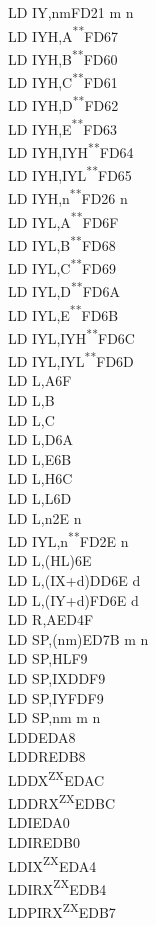 \documentclass[12pt,twoside,openright,a4paper]{book}
\newcommand{\UNDOC}{\textnormal{\textsuperscript{**}}}
\newcommand{\ZXN}{\textnormal{\textsuperscript{ZX}}}
\begin{document}
\begin{multicols}{3}
{\begin{tabbing}
		LD IY,nm\>FD21 m n\\
		LD IYH,A\UNDOC\>FD67\\
		LD IYH,B\UNDOC\>FD60\\
		LD IYH,C\UNDOC\>FD61\\
		LD IYH,D\UNDOC\>FD62\\
		LD IYH,E\UNDOC\>FD63\\
		LD IYH,IYH\UNDOC\>FD64\\
		LD IYH,IYL\UNDOC\>FD65\\
		LD IYH,n\UNDOC\>FD26 n\\
		LD IYL,A\UNDOC\>FD6F\\
		LD IYL,B\UNDOC\>FD68\\
		LD IYL,C\UNDOC\>FD69\\
		LD IYL,D\UNDOC\>FD6A\\
		LD IYL,E\UNDOC\>FD6B\\
		LD IYL,IYH\UNDOC\>FD6C\\
		LD IYL,IYL\UNDOC\>FD6D\\
		LD L,A\>6F\\
		LD L,B\\
		LD L,C\\
		LD L,D\>6A\\
		LD L,E\>6B\\
		LD L,H\>6C\\
		LD L,L\>6D\\
		LD L,n\>2E n\\
		LD IYL,n\UNDOC\>FD2E n\\
		LD L,(HL)\>6E\\
		LD L,(IX+d)\>DD6E d\\
		LD L,(IY+d)\>FD6E d\\
		LD R,A\>ED4F\\
		LD SP,(nm)\>ED7B m n\\
		LD SP,HL\>F9\\
		LD SP,IX\>DDF9\\
		LD SP,IY\>FDF9\\
		LD SP,nm m n\\
		LDD\>EDA8\\
		LDDR\>EDB8\\
		LDDX\ZXN\>EDAC\\
		LDDRX\ZXN\>EDBC\\
		LDI\>EDA0\\
		LDIR\>EDB0\\
		LDIX\ZXN\>EDA4\\
		LDIRX\ZXN\>EDB4\\
		LDPIRX\ZXN\>EDB7\\

\end{tabbing}}
\end{multicols}
\end{document}
